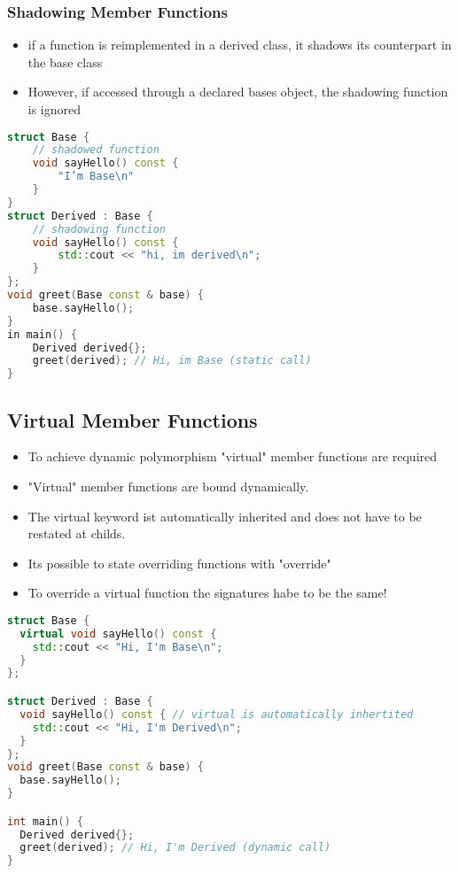 \subsubsection{Shadowing Member Functions}
\begin{itemize}
  \itemsep -0.5em 
  \item if a function is reimplemented in a derived class, it shadows its counterpart in the base class
  \item However, if accessed through a declared bases object, the shadowing function is ignored
\end{itemize}

\begin{lstlisting}[language=C++]
struct Base {
	// shadowed function 
	void sayHello() const {
		"I’m Base\n"
	}
}
struct Derived : Base {
	// shadowing function
	void sayHello() const {
		std::cout << "hi, im derived\n";
	}
};
void greet(Base const & base) {
	base.sayHello(); 
}
in main() {
	Derived derived{};
	greet(derived); // Hi, im Base (static call)
}
\end{lstlisting}

\subsection{Virtual Member Functions}
\begin{itemize}
  \itemsep -0.5em 
  \item To achieve dynamic polymorphism "virtual" member functions are required
  \item "Virtual" member functions are bound dynamically.
  \item The virtual keyword ist automatically inherited and does not have to be restated at childs.
  \item Its possible to state overriding functions with "override"
  \item To override a virtual function the signatures habe to be the same!
\end{itemize}

\begin{lstlisting}[language=C++]
struct Base {
  virtual void sayHello() const {
    std::cout << "Hi, I'm Base\n";
  }
};

struct Derived : Base {
  void sayHello() const { // virtual is automatically inhertited
    std::cout << "Hi, I'm Derived\n";
  }
};
void greet(Base const & base) {
  base.sayHello();
}

int main() {
  Derived derived{};
  greet(derived); // Hi, I'm Derived (dynamic call)
}
\end{lstlisting}

